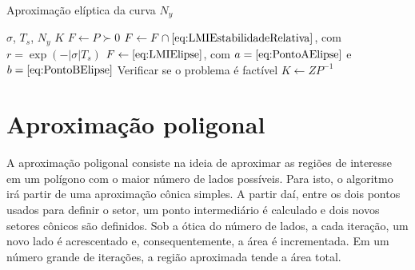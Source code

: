 \begin{algorithm}[hb!]
  \caption{Aproximação elíptica da curva $N_y$}\label{alg:AproximacaoElipticaNy}
  \begin{algorithmic}[1]
    \Require $\sigma$, $T_s$, $N_y$
    \Ensure $K$
    \State $F \gets P \succ 0$
    \State $F \gets F \cap \eqref{eq:LMIEstabilidadeRelativa}$, com $r = \exp{\left(-|\sigma|T_s\right)}$ 
    \State $F \gets \eqref{eq:LMIElipse}$, com $a = \eqref{eq:PontoAElipse}$ e $b = \eqref{eq:PontoBElipse}$ 
    \State Verificar se o problema é factível
    \State $K \gets ZP^{-1}$
  \end{algorithmic}
\end{algorithm}

\section{Aproximação poligonal}
A aproximação poligonal consiste na ideia de aproximar as regiões de interesse em um polígono com o maior número de lados possíveis. Para isto, o algoritmo irá partir de uma aproximação cônica simples. A partir daí, entre os dois pontos usados para definir o setor, um ponto intermediário é calculado e dois novos setores cônicos são definidos.
Sob a ótica do número de lados, a cada iteração, um novo lado é acrescentado e, consequentemente, a área é incrementada. Em um número grande de iterações, a região aproximada tende a área total.
